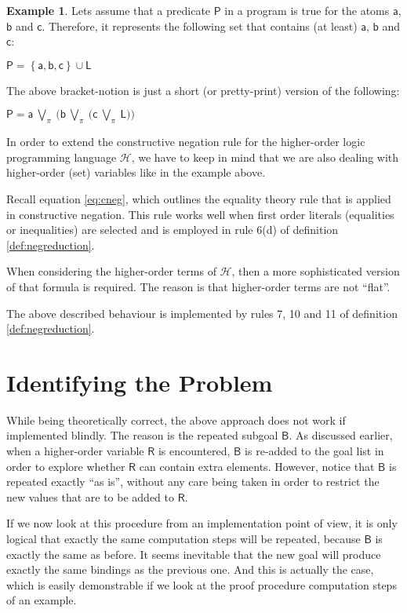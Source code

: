 \documentclass[inscr,ack,preface]{dithesis}
\theoremstyle{definition}
\newtheorem{example}{Example}[chapter]
\newcommand{\h}{$\mathcal{H}$}
\newcommand{\msf}[1]{$\mathsf{#1}$}
\begin{document}
\begin{example} Lets assume that a predicate \msf{P} in a program is true for the atoms \msf{a}, \msf{b} and \msf{c}. Therefore, it represents the following set that contains (at least) \msf{a}, \msf{b} and \msf{c}:
\begin{center}
  \msf{P = \left\{ a, b, c \right\} \cup L}
\end{center}

The above bracket-notion is just a short (or pretty-print) version of the following:
\begin{center}
  \msf{P = a ~\bigvee_{\pi}~ \big( b ~\bigvee_{\pi}~ \big( c ~\bigvee_{\pi}~ L \big) \big)}
\end{center}

\end{example}

In order to extend the constructive negation rule for the higher-order logic programming language \h{}, we have to keep in mind that we are also dealing with higher-order (set) variables like in the example above.

Recall equation \ref{eq:cneg}, which outlines the equality theory rule that is applied in constructive negation. This rule works well when first order literals (equalities or inequalities) are selected and is employed in rule 6(d) of definition \ref{def:negreduction}.

When considering the higher-order terms of \h{}, then a more sophisticated version of that formula is required. The reason is that higher-order terms are not ``flat''.

The above described behaviour is implemented by rules 7, 10 and 11 of definition \ref{def:negreduction}.

\section{Identifying the Problem}
While being theoretically correct, the above approach does not work if implemented blindly. The reason is the repeated subgoal \msf{B}. As discussed earlier, when a higher-order variable \msf{R} is encountered, \msf{B} is re-added to the goal list in order to explore whether \msf{R} can contain extra elements. However, notice that \msf{B} is repeated exactly ``as is'', without any care being taken in order to restrict the new values that are to be added to \msf{R}.

If we now look at this procedure from an implementation point of view, it is only logical that exactly the same computation steps will be repeated, because \msf{B} is exactly the same as before. It seems inevitable that the new goal will produce exactly the same bindings as the previous one. And this is actually the case, which is easily demonstrable if we look at the proof procedure computation steps of an example.
\end{document}
